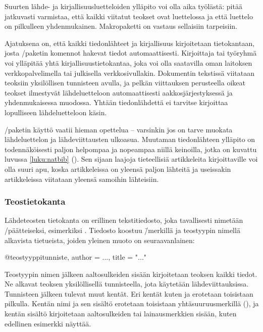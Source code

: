 Suurten lähde- ja kirjallisuusluetteloiden ylläpito voi olla aika
työlästä: pitää jatkuvasti varmistaa, että kaikki viitatut teokset ovat
luettelossa ja että luettelo on pilkulleen yhdenmukainen. Makropaketti
 on vastaus sellaisiin tarpeisiin.

Ajatuksena on, että kaikki tiedonlähteet ja kirjallisuus kirjoitetaan
tietokantaan, josta \-/paketin komennot hakevat tiedot
automaattisesti. Kirjoittaja tai työryhmä voi ylläpitää yhtä
kirjallisuustietokantaa, joka voi olla saatavilla oman laitoksen
verkkopalvelimella tai julkisella verkkosivullakin. Dokumentin tekstissä
viitataan teoksiin yksilöllisen tunnisteen avulla, ja pelkän viittauksen
perusteella oikeat teokset ilmestyvät lähdeluetteloon automaattisesti
aakkosjärjestyksessä ja yhdenmukaisessa muodossa. Yhtään tiedonlähdettä
ei tarvitse kirjoittaa lopulliseen lähdeluetteloon käsin.

\-/paketin käyttö vaatii hieman opettelua -- varsinkin
jos on tarve muokata lähdeluettelon ja lähdeviittausten ulkoasua.
Muutaman tiedonlähteen ylläpito on todennäköisesti paljon helpompaa ja
nopeampaa niillä keinoilla, jotka on kuvattu luvussa \ref{luku:natbib}
(). Sen sijaan laajoja tieteellisiä artikkeleita
kirjoittaville  voi olla suuri apu, koska
artikkeleissa on yleensä paljon lähteitä ja useissakin artikkeleissa
viitataan yleensä samoihin lähteisiin.

\subsubsection{Teostietokanta}

Lähdeteosten tietokanta on erillinen tekstitiedosto, joka tavallisesti
nimetään \-/päätteiseksi, esimerkiksi .
Tiedosto koostuu \=/merkillä ja teostyypin nimellä alkavista
tietueista, joiden yleinen muoto on seuraavanlainen:

\begin{koodilohkosis}
@teostyyppi{tunniste,
  author = {...},
  title = "..."
}
\end{koodilohkosis}

Teostyypin nimen jälkeen aaltosulkeiden sisään kirjoitetaan teoksen
kaikki tiedot. Ne alkavat teoksen yksilöllisellä tunnisteella, jota
käytetään lähdeviittauksissa. Tunnisteen jälkeen tulevat muut kentät.
Eri kentät kuten  ja  erotetaan toisistaan
pilkulla. Kentän nimi ja sen sisältö erotetaan toisistaan
yhtäsuuruusmerkillä (\koodi{=}), ja kentän sisältö kirjoitetaan
aaltosulkeiden tai lainausmerkkien sisään, kuten edellinen esimerkki
näyttää.

